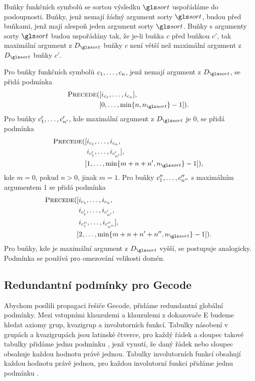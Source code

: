 {Buňky funkčních symbolů se sortou výsledku $\sort$
uspořádáme do posloupnosti.
Buňky, jenž nemají žádný argument sorty $\sort$, budou
před buňkami, jenž mají alespoň jeden
argument sorty $\sort$. Buňky s argumenty sorty $\sort$
budou uspořádány tak, že je-li buňka $c$
před buňkou $c'$, tak maximální argument z $D_\sort$ buňky $c$
není větší než maximální argument z $D_\sort$ buňky $c'$.

Pro buňky funkčních symbolů $c_1 , \ldots, c_n$,
jenž nemají argument z $D_\sort$,
se přidá podmínka
\[
\begin{split}
  \Precede([&i_{c_1} \comdots i_{c_n}], \\
           [&0 \comdots \min \{ n, n_\sort \} - 1]).
\end{split}
\]
Pro buňky $c'_1 , \ldots, c'_{n'}$, kde maximální argument z $D_\sort$
je 0, se přidá podmínka
\[
\begin{split}
  \Precede([&i_{c_1} \comdots i_{c_n}, \\
            &i_{c'_1} \comdots i_{c'_{n'}}], \\
           [&1 \comdots \min \{ m + n + n', n_\sort \} - 1]),
\end{split}
\]
kde $m = 0$, pokud $n > 0$, jinak $m = 1$.
Pro buňky $c''_1 , \ldots, c''_{n''}$ s maximálním argumentem
1 se přidá podmínka
\[
\begin{split}
  \Precede([&i_{c_1} \comdots i_{c_n},\\
            &i_{c'_1} \comdots i_{c'_{n'}},\\
            &i_{c''_1} \comdots i_{c''_{n''}}], \\
           [&2 \comdots \min \{ m + n + n' + n'', n_\sort \} - 1]).
\end{split}
\]
Pro buňky, kde je maximální argument z $D_\sort$ vyšší,
se postupuje analogicky. Podmínka \LowerEq{} se používá
pro omezování velikosti domén.

}

\subsection{Redundantní podmínky pro Gecode}

Abychom posílili propagaci řešiče Gecode, přidáme redundantní
globální pod\-mín\-ky.
Mezi vstupními klauzulemi a klauzulemi z dokazovače E
budeme hledat axiomy grup, kvazigrup a involutorních funkcí.
Tabulky násobení v grupách a kvazigrupách jsou latinské čtverce,
pro každý řádek a sloupec takové tabulky přidáme jednu podmínku
, jenž vynutí, že daný řádek nebo
sloupec obsahuje každou hodnotu právě jednou.
Tabulky involutorních funkcí obsahují každou hodnotu právě jednou,
pro každou involutorní funkci přidáme jednu podmínku
.

